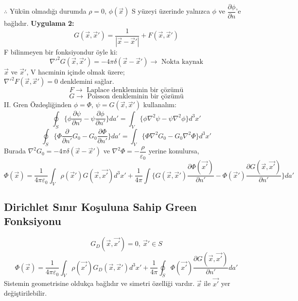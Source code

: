 \begin{theorem}
$\therefore$ Yükün olmadığı durumda $\rho = 0$, $\phi (\Vec{x})$ S yüzeyi üzerinde yalnızca $\phi$ ve $\dfrac{\partial \phi}{\partial n}$'e bağlıdır.
\newpage
\textbf{Uygulama 2:}
\[ G (\Vec{x}, \Vec{x}') = \dfrac{1}{|\Vec{x} - \Vec{x}'|} +  F (\Vec{x} , \Vec{x}') \]
F bilinmeyen bir fonksiyondur öyle ki:
\[ \nabla'^{2} G(\Vec{x}, \Vec{x}') = - 4 \pi \delta (\Vec{x} - \Vec{x}') \rightarrow \textrm{ Nokta kaynak}\]
$\Vec{x}$ ve $\Vec{x}' $, V hacminin içinde olmak üzere;\\
$\nabla'^{2} F(\Vec{x}, \Vec{x}') = 0$ denklemini sağlar.
\[ F \rightarrow \textrm{ Laplace denkleminin bir çözümü}\]
\[ G \rightarrow \textrm{ Poisson denkleminin bir çözümü}\]
II. Gren Özdeşliğinden $\phi = \Phi$, $\psi = G(\Vec{x}, \Vec{x}')$ kullanalım:
\[ \oint_{S}  \Bigg\{ \phi \dfrac{\partial \psi}{\partial n'} - \psi \dfrac{\partial \phi}{\partial n'} \Bigg\} da' = \int_{V} \Bigg\{ \phi \nabla^{2} \psi - \psi \nabla^{2} \phi  \Bigg\} d^{3}x' \]
\[ \oint_{S}  \Bigg\{ \Phi \dfrac{\partial}{\partial n'} G_{0} - G_{0} \dfrac{\partial \Phi}{\partial n'} \Bigg\} da' = \int_{V} \Bigg\{ \Phi \nabla^{2} G_{0} - G_{0} \nabla^{2} \Phi  \Bigg\} d^{3}x' \]
Burada $\nabla^{2} G_{0} = - 4 \pi \delta (\Vec{x} - \Vec{x}')$ ve $\nabla^{2} \Phi = - \dfrac{\rho}{\varepsilon_{0}}$ yerine konulursa,
\[ \Phi (\Vec{x}) = \dfrac{1}{4 \pi \varepsilon_{0}} \int_{V} \rho (\Vec{x}') G(\Vec{x}, \Vec{x'}) d^{3}x' + \dfrac{1}{4 \pi} \int \Bigg\{ G (\Vec{x}, \Vec{x}') \dfrac{\partial \Phi (\Vec{x'})}{\partial n'} - \Phi(\Vec{x}') \dfrac{\partial G (\Vec{x}, \Vec{x'})}{\partial n'}  \Bigg\} da' \]


\end{theorem}


\subsection{Dirichlet Sınır Koşuluna Sahip Green Fonksiyonu}

\begin{theorem}
\[ G_{D} (\Vec{x}, \Vec{x'}) = 0 , \ \Vec{x}' \in S \tag{1.43} \]
\[ \Phi (\Vec{x}) = \dfrac{1}{4 \pi \varepsilon_{0} } \int_{V} \rho(\Vec{x'}) G_{D} (\Vec{x}, \Vec{x}') d^{3}x' + \dfrac{1}{4 \pi} \oint_{S} \Phi (\Vec{x'}) \dfrac{\partial G (\Vec{x} , \Vec{x'})}{\partial n'} da' \tag{1.44} \]
Sistemin geometrisine oldukça bağlıdır ve simetri özelliği vardır. $\Vec{x}$ ile $\Vec{x'}$ yer değiştirilebilir.   
\end{theorem}
